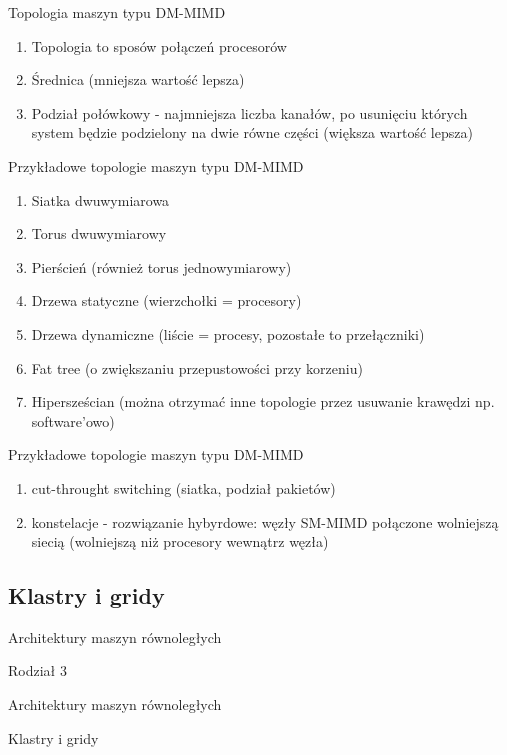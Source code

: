 \documentclass{beamer}
\begin{document}
\begin{frame}{Topologia maszyn typu DM-MIMD}
  \begin{enumerate}
  \item Topologia to sposów połączeń procesorów
  \item Średnica (mniejsza wartość lepsza)
  \item Podział połówkowy - najmniejsza liczba kanałów, po usunięciu których system będzie podzielony na dwie równe części (większa wartość lepsza)
  \end{enumerate}
\end{frame}

\begin{frame}{Przykładowe topologie maszyn typu DM-MIMD}
  \begin{enumerate}
  \item Siatka dwuwymiarowa
  \item Torus dwuwymiarowy
  \item Pierścień (również torus jednowymiarowy)
  \item Drzewa statyczne (wierzchołki = procesory)
  \item Drzewa dynamiczne (liście = procesy, pozostałe to przełączniki)
  \item Fat tree (o zwiększaniu przepustowości przy korzeniu)
  \item Hipersześcian (można otrzymać inne topologie przez usuwanie krawędzi np. software'owo)
  \end{enumerate}
\end{frame}

\begin{frame}{Przykładowe topologie maszyn typu DM-MIMD}
  \begin{enumerate}
  \item cut-throught switching (siatka, podział pakietów)
  \item konstelacje - rozwiązanie hybyrdowe: węzły SM-MIMD połączone wolniejszą siecią (wolniejszą niż procesory wewnątrz węzła)
  \end{enumerate}
\end{frame}

\subsection{Klastry i gridy}
\begin{frame}{Architektury maszyn równoległych}
  \huge
  \begin{center}
    Rodział 3

    Architektury maszyn równoległych

    \large

    Klastry i gridy
  \end{center}
\end{frame}
\end{document}
